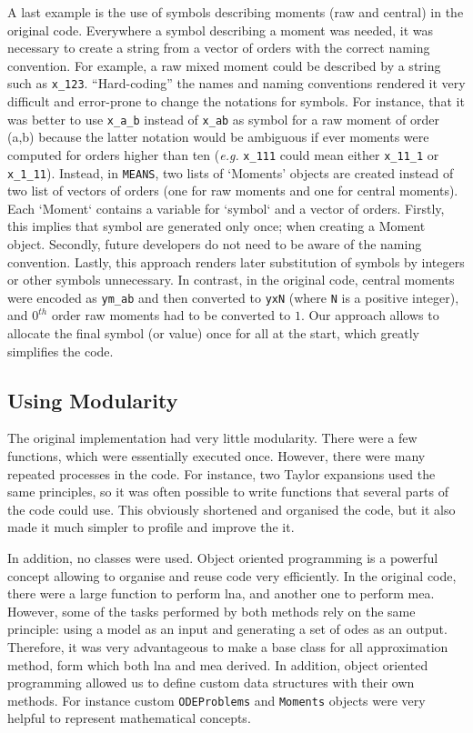 \documentclass[11pt,a4paper]{article}
\newcommand{\means}{\texttt{MEANS}}
\newcommand{\eg}{\emph{e.g.}}
\begin{document}
A last example is the use of symbols describing moments (raw and central) in the original code.
Everywhere a symbol describing a moment was needed, it was necessary to create a string from a vector of orders with the correct naming convention.
For example, a raw mixed moment could be described by a string such as \verb"x_123".
``Hard-coding'' the names and naming conventions rendered it very difficult and error-prone to change the notations for symbols.
For instance, that it was better to use \verb"x_a_b" instead of \verb"x_ab" as symbol for a raw moment of order (a,b)
because the latter notation would be ambiguous if ever moments were computed for orders higher than ten (\eg{} \verb"x_111" could mean either \verb"x_11_1"  or \verb"x_1_11").
Instead, in \means, two lists of `Moments' objects are created instead of two list of vectors of orders (one for raw moments and one for central moments).
Each `Moment` contains a variable for `symbol` and a vector of orders.
Firstly, this implies that symbol are generated only once; when creating a Moment object.
Secondly, future developers do not need to be aware of the naming convention.
Lastly, this approach renders later substitution of symbols by integers or other symbols unnecessary.
In contrast, in the original code, central moments were encoded as \verb"ym_ab" and then
converted to \verb"yxN" (where \verb"N"  is a positive integer),
and $0^{th}$ order raw moments had to be converted to $1$.
Our approach allows to allocate the final symbol (or value) once for all at the start, which greatly simplifies the code.

\subsection{Using Modularity}

The original implementation had very little modularity.
There were a few functions, which were essentially executed once.
However, there were many repeated processes in the code.
For instance, two Taylor expansions used the same principles, 
so it was often possible to write functions that several parts of the code could use.
This obviously shortened and organised the code, but it also made it much simpler to profile and improve the it.
 
In addition, no classes were used.
Object oriented programming is a powerful concept allowing to organise and reuse code very efficiently.
In the original code, there were a large function to perform \gls{lna}, and another one to perform \gls{mea}.
However, some of the tasks performed by both methods rely on the same principle: using a model as an input and generating a set of \glspl{ode} as an output.
Therefore, it was very advantageous to make a base class for all approximation method, form which both \gls{lna} and \gls{mea} derived.
In addition, object oriented programming allowed us to define custom data structures with their own methods.
For instance custom \texttt{ODEProblems} and \texttt{Moments} objects were very helpful to represent mathematical concepts.
\end{document}
